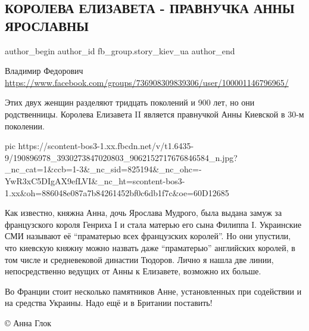  
 
 
 
 
 
\subsection{КОРОЛЕВА ЕЛИЗАВЕТА - ПРАВНУЧКА АННЫ ЯРОСЛАВНЫ}
\label{sec:25_05_2021.fb.fb_group.story_kiev_ua.1.anna_jaroslavna_elizaveta_II}
\ifcmt
 author_begin
   author_id fb_group.story_kiev_ua
 author_end
\fi

Владимир Федорович
\url{https://www.facebook.com/groups/736908309839306/user/100001146796965/}

Этих двух женщин разделяют тридцать поколений и 900 лет, но они
родственницы.  Королева Елизавета II является правнучкой Анны Киевской в
30-м поколении. 


\ifcmt
  pic https://scontent-bos3-1.xx.fbcdn.net/v/t1.6435-9/190896978_3930273847020803_9062152717676846584_n.jpg?_nc_cat=1&ccb=1-3&_nc_sid=825194&_nc_ohc=-YwR3xC5DIgAX9efLVI&_nc_ht=scontent-bos3-1.xx&oh=886048e087a7b84261452bf0c6db1f7c&oe=60D12685
\fi


Как известно, княжна Анна, дочь Ярослава Мудрого, была выдана замуж за
французского короля Генриха I и стала матерью его сына Филиппа I. Украинские
СМИ называют её \enquote{праматерью всех французских королей}. Но они упустили, что
киевскую княжну можно назвать даже \enquote{праматерью} английских королей, в том
числе и средневековой династии Тюдоров. Лично я нашла две линии,
непосредственно ведущих от Анны к Елизавете,  возможно их больше. 

Во Франции стоит несколько памятников Анне, установленных при содействии и на
средства Украины. Надо ещё и в Британии поставить!

© Анна Глок
